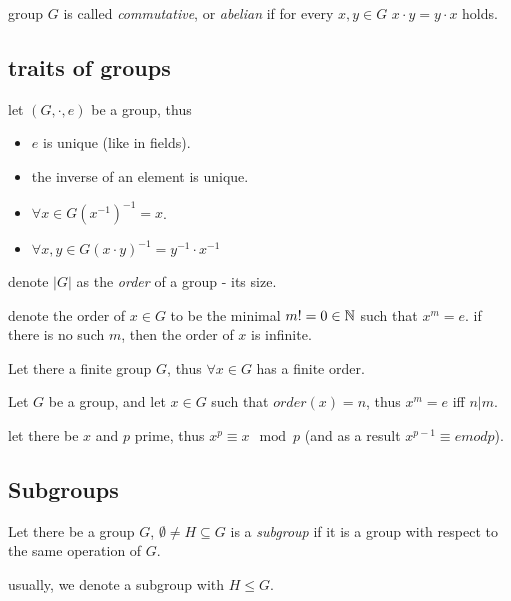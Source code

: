 \begin{defn}
    group $G$ is called \emph{commutative}, or \emph{abelian} if for every $x,y\in G$ $x\cdot y=y\cdot x$ holds.
\end{defn}

\subsection{traits of groups}
let $(G,\cdot,e)$ be a group, thus
\begin{itemize}
    \item $e$ is unique (like in fields).
    \item the inverse of an element is unique.
    \item $\forall x\in G (x^{-1})^{-1}=x$.
    \item $\forall x,y\in G (x\cdot y)^{-1}=y^{-1}\cdot x^{-1}$
\end{itemize}


\begin{defn}
    denote $|G|$ as the \emph{order} of a group - its size.
\end{defn}

\begin{defn}
    denote the order of $x\in G$ to be the minimal $m!=0\in\mathbb{N}$ such that  $x^m=e$. if there is no such $m$, then
    the order of $x$ is infinite.
\end{defn}

\begin{thm}
    Let there a finite group $G$, thus $\forall x\in G$ has a finite order.
\end{thm}

\begin{thm}
    Let $G$ be a group, and let $x\in G$ such that $order(x)=n$, thus $x^m=e$ iff $n|m$.
\end{thm}

\begin{thm}\label{fermats-little-theorem}
    let there be $x$ and $p$ prime, thus $x^p \equiv x \mod p$
    (and as a result $x^{p-1}\equiv e mod p$).
\end{thm}

\subsection{Subgroups}

\begin{defn}
    Let there be a group $G$, $\emptyset \neq H\subseteq G$  is a \emph{subgroup} if it is a group
     with respect to the same operation of $G$.
\end{defn}
usually, we denote a subgroup with $H\le G$.

